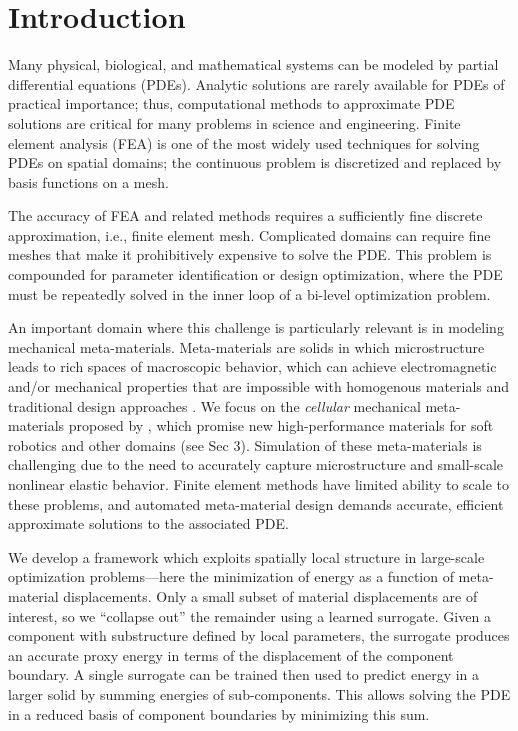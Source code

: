 \vspace{-0.2cm}\section{Introduction}\vspace{-0.2cm}
Many physical, biological, and mathematical systems can be modeled by partial differential equations (PDEs).
Analytic solutions are rarely available for PDEs of practical importance; thus, computational methods to approximate PDE solutions are critical for many problems in science and engineering.
Finite element analysis (FEA) is one of the most widely used techniques for solving PDEs on spatial domains; the continuous problem is discretized and replaced by basis functions on a mesh.

The accuracy of FEA and related methods requires a sufficiently fine discrete approximation, i.e., finite element mesh.
Complicated domains can require fine meshes that make it prohibitively expensive to solve the PDE.
This problem is compounded for parameter identification or design optimization,
where the PDE must be repeatedly solved in the inner loop of a bi-level optimization problem.

An important domain where this challenge is particularly relevant is in modeling mechanical meta-materials.
Meta-materials are solids in which microstructure leads to rich spaces of macroscopic behavior, which can achieve electromagnetic and/or mechanical properties that are impossible with homogenous materials and traditional design approaches \citep{poddubny2013hyperbolic,cai2010optical,bertoldi2017flexible}.
We focus on the \emph{cellular} mechanical meta-materials proposed by \citet{overvelde2014relating}, which promise new high-performance materials for soft robotics and other domains (see Sec 3).
Simulation of these meta-materials is challenging due to the need to accurately capture microstructure and small-scale nonlinear elastic behavior.
Finite element methods have limited ability to scale to these problems, and automated meta-material design demands accurate, efficient approximate solutions to the associated PDE.

We develop a framework which exploits spatially local structure in large-scale optimization problems---here the minimization of energy as a function of meta-material displacements.
Only a small subset of material displacements are of interest, so we ``collapse out'' the remainder using a learned surrogate.
Given a component with substructure defined by local parameters, the surrogate produces an accurate proxy energy in terms of the displacement of the component boundary.
A single surrogate can be trained then used to predict energy in a larger solid by summing energies of sub-components.
This allows solving the PDE in a reduced basis of component boundaries by minimizing this sum.

